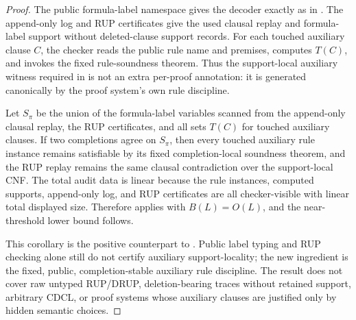 \documentclass[11pt]{article}
\theoremstyle{definition}
\begin{document}
\begin{proof}
The public formula-label namespace gives the decoder exactly as in
.  The append-only log and RUP
certificates give the used clausal replay and formula-label support without
deleted-clause support records.  For each touched auxiliary clause \(C\), the
checker reads the public rule name and premises, computes \(T(C)\), and invokes
the fixed rule-soundness theorem.  Thus the support-local auxiliary witness
required in  is not an extra
per-proof annotation: it is generated canonically by the proof system's own
rule discipline.

Let \(S_\pi\) be the union of the formula-label variables scanned from the
append-only clausal replay, the RUP certificates, and all sets \(T(C)\) for
touched auxiliary clauses.  If two completions agree on \(S_\pi\), then every
touched auxiliary rule instance remains satisfiable by its fixed
completion-local soundness theorem, and the RUP replay remains the same
clausal contradiction over the support-local CNF.  The total audit data is
linear because the rule instances, computed supports, append-only log, and RUP
certificates are all checker-visible with linear total displayed size.
Therefore  applies with
\(B(L)=O(L)\), and the near-threshold lower bound follows.

This corollary is the positive counterpart to
.  Public label typing
and RUP checking alone still do not certify auxiliary support-locality; the
new ingredient is the fixed, public, completion-stable auxiliary rule
discipline.  The result does not cover raw untyped RUP/DRUP, deletion-bearing
traces without retained support, arbitrary CDCL, or proof systems whose
auxiliary clauses are justified only by hidden semantic choices.
\end{proof}
\end{document}
